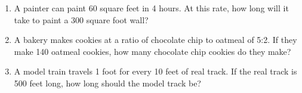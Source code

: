 \documentclass[12pt, letterpaper, fleqn]{article}
\begin{document}
\begin{enumerate}[itemsep=2.5cm, leftmargin=0.6cm]

\item A painter can paint 60 square feet in 4 hours. At this rate, how long will it take to paint a 300 square foot wall?

\vspace{2.8cm}

\item A bakery makes cookies at a ratio of chocolate chip to oatmeal of 5:2. If they make 140 oatmeal cookies, how many chocolate chip cookies do they make?

\vspace{2.8cm}

\item A model train travels 1 foot for every 10 feet of real track. If the real track is 500 feet long, how long should the model track be?

\vspace{2.8cm}

\end{enumerate}
\end{document}
